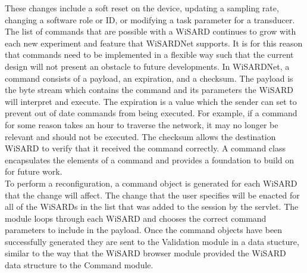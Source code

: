 These changes include a soft reset on the device, updating a sampling rate, changing a software role or ID, or modifying a task parameter for a transducer. The list of commands that are possible with a WiSARD continues to grow with each new experiment and feature that WiSARDNet supports. It is for this reason that commands need to be implemented in a flexible way such that the current design will not present an obstacle to future developments. In WiSARDNet, a command consists of a payload, an expiration, and a checksum. The payload is the byte stream which contains the command and its parameters the WiSARD will interpret and execute. The expiration is a value which the sender can set to prevent out of date commands from being executed. For example, if a command for some reason takes an hour to traverse the network, it may no longer be relevant and should not be executed. The checksum allows the destination WiSARD to verify that it received the command correctly. A command class encapsulates the elements of a command and provides a foundation to build on for future work.\\

To perform a reconfiguration, a command object is generated for each WiSARD that the change will affect. The change that the user specifies will be enacted for all of the WiSARDs in the list that was added to the session by the servlet. The module loops through each WiSARD and chooses the correct command parameters to include in the payload. Once the command objects have been successfully generated they are sent to the Validation module in a data stucture, similar to the way that the WiSARD browser module provided the WiSARD data structure to the Command module.



